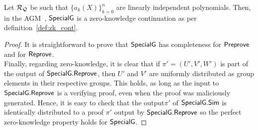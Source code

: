 \begin{theorem}
\label{sec_specg}
Let $\mathcal{R}_{\mathcal{Q}}$ be such that $\{a_k(X)\}_{k=0}^n$ are linearly independent polynomials. Then, in the 
AGM~\cite{Fuchs_AGM}, ${\mathsf{SpecialG}}$ is a zero-knowledge continuation as per definition~\ref{def:zk_cont}. 
\end{theorem}
\begin{proof} It is straightforward to prove that ${\mathsf{SpecialG}}$ has completeness for ${\mathsf{Preprove}}$ and for ${\mathsf{Reprove}}$. \\

\noindent Finally, regarding zero-knowledge, it is clear that if $\pi' = (U', V', W')$ is part of the output of ${\mathsf{SpecialG}}.{\mathsf{Reprove}}$, 
then $U'$ and $V'$ are uniformly distributed as group elements in their respective groups. This holds, as long as the 
input to ${\mathsf{SpecialG}}.{\mathsf{Reprove}}$ is a verifying proof, even when the proof was maliciously generated. Hence, it is easy to check  
that the output$\pi'$ of ${\mathsf{SpecialG}}.{\mathsf{Sim}}$ is identically distributed to a proof $\pi'$ output by ${\mathsf{SpecialG}}.{\mathsf{Reprove}}$ so the perfect 
zero-knowledge property holds for ${\mathsf{SpecialG}}$.
\end{proof}

